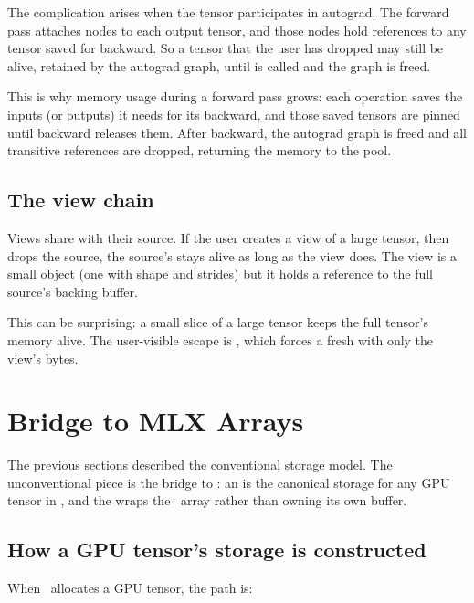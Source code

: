 The complication arises when the tensor participates in autograd.
The forward pass attaches  nodes to each output
tensor, and those nodes hold 
references to any tensor saved for backward. So a tensor that the
user has dropped may still be alive, retained by the autograd graph,
until  is called and the graph is freed.

This is why memory usage during a forward pass grows: each
operation saves the inputs (or outputs) it needs for its backward,
and those saved tensors are pinned until backward releases them.
After backward, the autograd graph is freed and all transitive
references are dropped, returning the memory to the pool.

\subsection{The view chain}
\label{ssec:tensor_model:view_chain}

Views share  with their source. If the user creates a
view of a large tensor, then drops the source, the source's
 stays alive as long as the view does. The view is a
small object (one  with shape and strides) but it
holds a reference to the full source's backing buffer.

This can be surprising: a small slice of a large tensor keeps the
full tensor's memory alive. The user-visible escape is
, which forces a fresh  with only
the view's bytes.

\section{Bridge to MLX Arrays}
\label{sec:tensor_model:bridge}

The previous sections described the conventional storage model. The
unconventional piece is the bridge to \MLX: an 
is the canonical storage for any GPU tensor in \Lucid, and the
 wraps the \MLX\ array rather than owning its own
buffer.

\subsection{How a GPU tensor's storage is constructed}
\label{ssec:tensor_model:gpu_storage}

When \Lucid\ allocates a GPU tensor, the path is:

